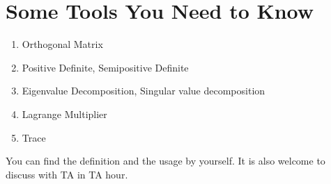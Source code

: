 \documentclass{article}
\begin{document}
\section*{Some Tools You Need to Know}
\begin{enumerate}
\item Orthogonal Matrix
\item Positive Definite, Semipositive Definite
\item Eigenvalue Decomposition, Singular value decomposition
\item Lagrange Multiplier
\item Trace
\end{enumerate}
You can find the definition and the usage by yourself. It is also welcome to discuss with TA in TA hour.

\end{document}
